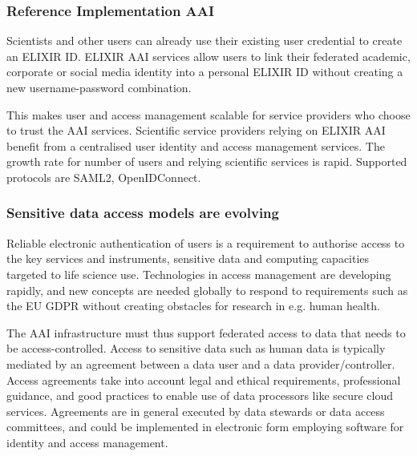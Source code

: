 \documentclass[fleqn,11pt]{wlscirep}
\begin{document}
{\subsubsection{Reference Implementation AAI}
Scientists and other users can already use their existing user credential to create an ELIXIR ID\cite{elixir-aai}. ELIXIR AAI services allow users to link their federated academic, corporate or social media identity into a personal ELIXIR ID without creating a new username-password combination.  

This makes user and access management scalable for service providers who choose to trust the AAI services. Scientific service providers relying on ELIXIR AAI benefit from a centralised user identity and access management services. The growth rate for number of users and relying scientific services is rapid. Supported protocols are SAML2, OpenIDConnect.

\subsubsection{Sensitive data access models are evolving}
Reliable electronic authentication of users is a requirement to authorise access to the key services and instruments, sensitive data and computing capacities targeted to life science use. Technologies in access management are developing rapidly, and new concepts are needed globally to respond to requirements such as the EU GDPR without creating obstacles for research in e.g. human health.

The AAI infrastructure must thus support federated access to data that needs to be access-controlled. Access to sensitive data such as human data is typically mediated by an agreement between a data user and a data provider/controller. Access agreements take into account legal and ethical requirements, professional guidance, and good practices to enable use of data processors like secure cloud services. Agreements are in general executed by data stewards or data access committees, and could be implemented in electronic form employing software for identity and access management.\cite{Brandizi2017}\cite{Linden}
 
}
\end{document}
